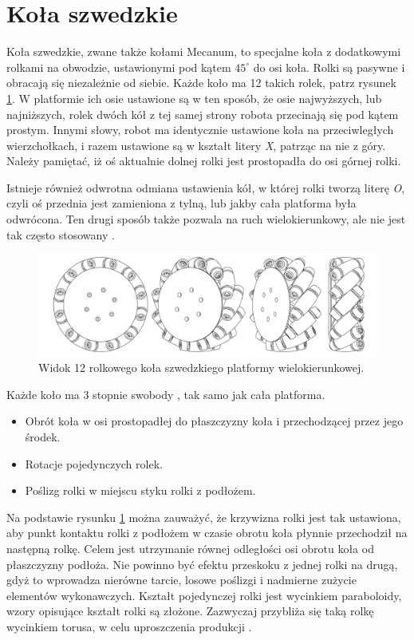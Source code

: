 \section{Koła szwedzkie}
	Koła szwedzkie, zwane także kołami Mecanum, to specjalne koła z dodatkowymi rolkami na obwodzie, ustawionymi pod kątem $45^\circ$ do osi koła.
	Rolki są pasywne i obracają się niezależnie od siebie. Każde koło ma 12 takich rolek, patrz rysunek \ref{fig:wheel}.
	W platformie ich osie ustawione są w ten sposób, że osie najwyższych, lub najniższych, rolek dwóch kół z tej samej strony robota przecinają się pod kątem prostym.
	Innymi słowy, robot ma identycznie ustawione koła na przeciwległych wierzchołkach, i razem ustawione są w kształt litery \emph{X}, patrząc na nie z góry.
	Należy pamiętać, iż oś aktualnie dolnej rolki jest prostopadła do osi górnej rolki.

	Istnieje również odwrotna odmiana ustawienia kół, w której rolki tworzą literę \emph{O}, 
	czyli oś przednia jest zamieniona z tylną, lub jakby cała platforma była odwrócona.
	Ten drugi sposób także pozwala na ruch wielokierunkowy, ale nie jest tak często stosowany \cite{paletobot}.

	\begin{figure}[H]
	\centering
	\includegraphics[width=\textwidth]{graphics/wheel.pdf}
	\caption{Widok 12 rolkowego koła szwedzkiego platformy wielokierunkowej.}
	\label{fig:wheel}
	\end{figure} 

	Każde koło ma 3 stopnie swobody \cite{kinematic_modeling}, tak samo jak cała platforma.
	\begin{itemize}
		\item Obrót koła w osi prostopadłej do płaszczyzny koła i przechodzącej przez jego środek.
		\item Rotacje pojedynczych rolek.
		\item Poślizg rolki w miejscu styku rolki z podłożem.
	\end{itemize}

	Na podstawie rysunku \ref{fig:wheel} można zauważyć, że krzywizna rolki jest tak ustawiona, aby punkt kontaktu rolki z podłożem w czasie obrotu koła płynnie przechodził na następną rolkę.
	Celem jest utrzymanie równej odległości osi obrotu koła od płaszczyzny podłoża.
	Nie powinno być efektu przeskoku z jednej rolki na drugą, gdyż to wprowadza nierówne tarcie, losowe poślizgi i nadmierne zużycie elementów wykonawczych.
	Kształt pojedynczej rolki jest wycinkiem paraboloidy, wzory opisujące kształt rolki są złożone.
	Zazwyczaj przybliża się taką rolkę wycinkiem torusa, w celu uproszczenia produkcji \cite{rollers}.

